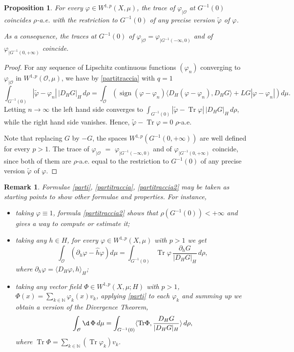 \documentclass[reqno,twoside,12pt]{amsart}
\newtheorem{Proposition}[Theorem]{Proposition}
\newtheorem{Remark}[Theorem]{Remark}
\begin{document}
\begin{Proposition}
\label{tracciapuntuale}
For every  $\varphi\in W^{1,p}(X, \mu)$, the trace of $\varphi_{|{\mathcal O}}$ at $G^{-1}(0)$ coincides $\rho$-a.e. with the restriction to $G^{-1}(0)$ of any precise version $\widetilde{\varphi}$ of $\varphi$. 

As a consequence, the traces at $G^{-1}(0)$  of  $\varphi_{|{\mathcal O}} = \varphi_{|G^{-1}(-\infty, 0)}$ and of $\varphi_{|G^{-1}(0, +\infty)}$ coincide. 
\end{Proposition}
\begin{proof}
For any sequence of Lipschitz continuous functions $(\varphi_n)$ converging to $\varphi_{|{\mathcal O}}$ in $W^{1,p}({\mathcal O}, \mu)$, we have by \eqref{partitraccia} with $q=1$
$$\int_{G^{-1}(0)} |\widetilde{\varphi}-\varphi_n|\, |D_HG|_H\,d\rho = \int_{\mathcal O}({\operatorname{sign}} (\varphi - \varphi_n)
\langle D_H(\varphi - \varphi_n), D_HG\rangle + LG |\varphi - \varphi_n|) d\mu .$$
Letting $n\to \infty$ the left hand side converges to $\int_{G^{-1}(0)} |\widetilde{\varphi}-{\operatorname{Tr}} \varphi|\, |D_HG|_H\,d\rho$, while the right hand side vanishes. Hence, $\widetilde{\varphi}-{\operatorname{Tr}} \varphi =0$ $\rho$-a.e.

Note that replacing $G$ by $-G$, the spaces $W^{1,p} (G^{-1}(0, +\infty))$ are well defined for every $p>1$. The trace of $\varphi_{|{\mathcal O}}$ $=$  $\varphi_{|G^{-1}(-\infty, 0)}$  and of $\varphi_{|G^{-1}(0, +\infty)}$ coincide, since both of them 
are $\rho$-a.e. equal to the restriction to $G^{-1}(0)$ of any precise version $\widetilde{\varphi}$ of $\varphi$. 
\end{proof}

\begin{Remark}
Formulae \eqref{parti}, \eqref{partitraccia}, \eqref{partitraccia2} may be taken as starting points to show other formulae and properties. For instance, 
\begin{itemize}
\item[(i)] taking $\varphi \equiv 1 $, formula \eqref{partitraccia2} shows that $\rho(G^{-1}(0)) <+\infty$ and gives a  way to compute or estimate it; 
\item[(ii)] taking any $h\in H$, for every $\varphi \in W^{1,p}(X, \mu)$ with $p>1$ we get
\begin{equation}
\label{partial_h}
\int_{\mathcal O} (\partial_h \varphi - \hat{h}\varphi)d\mu = \int_{G^{-1}(0)} {\operatorname{Tr}} \varphi \, \frac{\partial_h G}{|D_HG|_H}\,d\rho, 
\end{equation}
where  $\partial_h \varphi = \langle D_H\varphi, h\rangle_H$; 
\item[(iii)] taking any vector field $\Phi \in W^{1,p}(X, \mu; H)$ with $p>1$, $\Phi(x) = \sum_{k\in {\mathbb N}}\varphi_k(x) v_k$, applying \eqref{parti} to each $\varphi_k$ and summing up we obtain a version of the Divergence Theorem, 
$$\int_{\mathcal O} \d\,\Phi\, d\mu = \int_{G^{-1}(0)} \langle {\operatorname{Tr}} \Phi, \frac{D_HG}{|D_HG|_H}\rangle \,d\rho ,$$
where $ {\operatorname{Tr}} \Phi =  \sum_{k\in {\mathbb N}}({\operatorname{Tr}} \varphi_k) v_k$. 
\end{itemize}
\end{Remark}
\end{document}
